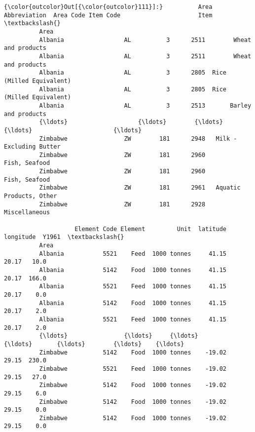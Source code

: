 \documentclass[11pt]{article}
\begin{document}
\begin{Verbatim}[commandchars=\\\{\}]
{\color{outcolor}Out[{\color{outcolor}111}]:}          Area Abbreviation  Area Code Item Code                      Item  \textbackslash{}
          Area                                                                        
          Albania                 AL          3      2511        Wheat and products   
          Albania                 AL          3      2511        Wheat and products   
          Albania                 AL          3      2805  Rice (Milled Equivalent)   
          Albania                 AL          3      2805  Rice (Milled Equivalent)   
          Albania                 AL          3      2513       Barley and products   
          {\ldots}                    {\ldots}        {\ldots}       {\ldots}                       {\ldots}   
          Zimbabwe                ZW        181      2948   Milk - Excluding Butter   
          Zimbabwe                ZW        181      2960             Fish, Seafood   
          Zimbabwe                ZW        181      2960             Fish, Seafood   
          Zimbabwe                ZW        181      2961   Aquatic Products, Other   
          Zimbabwe                ZW        181      2928             Miscellaneous   
          
                    Element Code Element         Unit  latitude  longitude  Y1961  \textbackslash{}
          Area                                                                      
          Albania           5521    Feed  1000 tonnes     41.15      20.17   10.0   
          Albania           5142    Food  1000 tonnes     41.15      20.17  166.0   
          Albania           5521    Feed  1000 tonnes     41.15      20.17    0.0   
          Albania           5142    Food  1000 tonnes     41.15      20.17    2.0   
          Albania           5521    Feed  1000 tonnes     41.15      20.17    2.0   
          {\ldots}                {\ldots}     {\ldots}          {\ldots}       {\ldots}        {\ldots}    {\ldots}   
          Zimbabwe          5142    Food  1000 tonnes    -19.02      29.15  230.0   
          Zimbabwe          5521    Feed  1000 tonnes    -19.02      29.15   27.0   
          Zimbabwe          5142    Food  1000 tonnes    -19.02      29.15    6.0   
          Zimbabwe          5142    Food  1000 tonnes    -19.02      29.15    0.0   
          Zimbabwe          5142    Food  1000 tonnes    -19.02      29.15    0.0   
          

\end{Verbatim}
\end{document}
